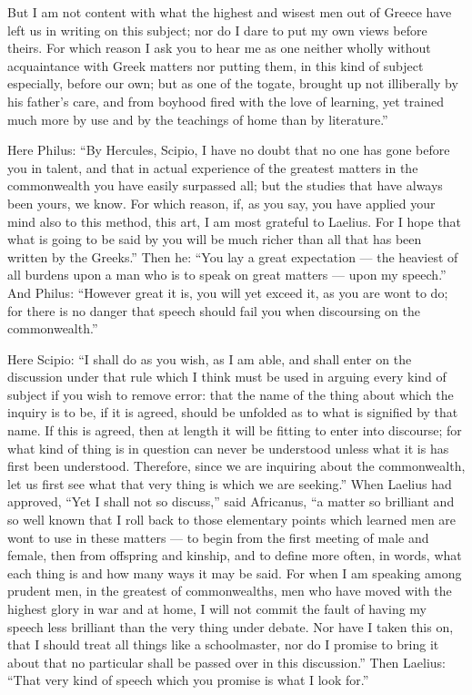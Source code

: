 But I am not content with what the highest and wisest men out of Greece have left us in writing on this subject; nor do I dare to put my own views before theirs. For which reason I ask you to hear me as one neither wholly without acquaintance with Greek matters nor putting them, in this kind of subject especially, before our own; but as one of the togate, brought up not illiberally by his father's care, and from boyhood fired with the love of learning, yet trained much more by use and by the teachings of home than by literature.''

 Here Philus: ``By Hercules, Scipio, I have no doubt that no one has gone before you in talent, and that in actual experience of the greatest matters in the commonwealth you have easily surpassed all; but the studies that have always been yours, we know. For which reason, if, as you say, you have applied your mind also to this method, this art, I am most grateful to Laelius. For I hope that what is going to be said by you will be much richer than all that has been written by the Greeks.'' Then he: ``You lay a great expectation --- the heaviest of all burdens upon a man who is to speak on great matters --- upon my speech.'' And Philus: ``However great it is, you will yet exceed it, as you are wont to do; for there is no danger that speech should fail you when discoursing on the commonwealth.''

 Here Scipio: ``I shall do as you wish, as I am able, and shall enter on the discussion under that rule which I think must be used in arguing every kind of subject if you wish to remove error: that the name of the thing about which the inquiry is to be, if it is agreed, should be unfolded as to what is signified by that name. If this is agreed, then at length it will be fitting to enter into discourse; for what kind of thing is in question can never be understood unless what it is has first been understood. Therefore, since we are inquiring about the commonwealth, let us first see what that very thing is which we are seeking.'' When Laelius had approved, ``Yet I shall not so discuss,'' said Africanus, ``a matter so brilliant and so well known that I roll back to those elementary points which learned men are wont to use in these matters --- to begin from the first meeting of male and female, then from offspring and kinship, and to define more often, in words, what each thing is and how many ways it may be said. For when I am speaking among prudent men, in the greatest of commonwealths, men who have moved with the highest glory in war and at home, I will not commit the fault of having my speech less brilliant than the very thing under debate. Nor have I taken this on, that I should treat all things like a schoolmaster, nor do I promise to bring it about that no particular shall be passed over in this discussion.'' Then Laelius: ``That very kind of speech which you promise is what I look for.''

